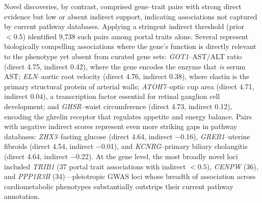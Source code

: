 Novel discoveries, by contrast, comprised gene--trait pairs with strong direct evidence but low or absent indirect support, indicating associations not captured by current pathway databases. Applying a stringent indirect threshold (prior $< 0.5$) identified 9,738 such pairs among portal traits alone. Several represent biologically compelling associations where the gene's function is directly relevant to the phenotype yet absent from curated gene sets: \textit{GOT1}--AST/ALT ratio (direct 4.75, indirect 0.42), where the gene encodes the enzyme that \emph{is} serum AST; \textit{ELN}--aortic root velocity (direct 4.76, indirect 0.38), where elastin is the primary structural protein of arterial walls; \textit{ATOH7}--optic cup area (direct 4.71, indirect 0.04), a transcription factor essential for retinal ganglion cell development; and \textit{GHSR}--waist circumference (direct 4.73, indirect 0.12), encoding the ghrelin receptor that regulates appetite and energy balance. Pairs with negative indirect scores represent even more striking gaps in pathway databases: \textit{ZHX3}--fasting glucose (direct 4.64, indirect $-$0.16), \textit{GREB1}--uterine fibroids (direct 4.54, indirect $-$0.01), and \textit{KCNRG}--primary biliary cholangitis (direct 4.64, indirect $-$0.22). At the gene level, the most broadly novel loci included \textit{TRIB1} (37 portal trait associations with indirect $< 0.5$), \textit{CENPW} (36), and \textit{PPP1R3B} (34)---pleiotropic GWAS loci whose breadth of association across cardiometabolic phenotypes substantially outstrips their current pathway annotation.

